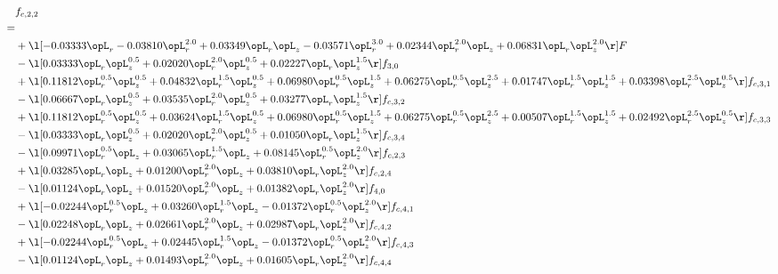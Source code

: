 \begin{alignat}{2} 
\label{eq:f_22_2} 
& f_{c,2,2} \nonumber \\ 
 = \\ 
& + \l[  -0.03333 \opL_r   -0.03810 \opL_r^{2.0} +  0.03349 \opL_r \opL_z   -0.03571 \opL_r^{3.0} +  0.02344 \opL_r^{2.0} \opL_z +  0.06831 \opL_r \opL_z^{2.0}  \r] F \nonumber \\ 
& - \l[  0.03333 \opL_r \opL_z^{0.5} +  0.02020 \opL_r^{2.0} \opL_z^{0.5} +  0.02227 \opL_r \opL_z^{1.5}  \r] f_{3,0} \nonumber \\ 
& + \l[  0.11812 \opL_r^{0.5} \opL_z^{0.5} +  0.04832 \opL_r^{1.5} \opL_z^{0.5} +  0.06980 \opL_r^{0.5} \opL_z^{1.5} +  0.06275 \opL_r^{0.5} \opL_z^{2.5} +  0.01747 \opL_r^{1.5} \opL_z^{1.5} +  0.03398 \opL_r^{2.5} \opL_z^{0.5}  \r] f_{c,3,1} \nonumber \\ 
& - \l[  0.06667 \opL_r \opL_z^{0.5} +  0.03535 \opL_r^{2.0} \opL_z^{0.5} +  0.03277 \opL_r \opL_z^{1.5}  \r] f_{c,3,2} \nonumber \\ 
& + \l[  0.11812 \opL_r^{0.5} \opL_z^{0.5} +  0.03624 \opL_r^{1.5} \opL_z^{0.5} +  0.06980 \opL_r^{0.5} \opL_z^{1.5} +  0.06275 \opL_r^{0.5} \opL_z^{2.5} +  0.00507 \opL_r^{1.5} \opL_z^{1.5} +  0.02492 \opL_r^{2.5} \opL_z^{0.5}  \r] f_{c,3,3} \nonumber \\ 
& - \l[  0.03333 \opL_r \opL_z^{0.5} +  0.02020 \opL_r^{2.0} \opL_z^{0.5} +  0.01050 \opL_r \opL_z^{1.5}  \r] f_{c,3,4} \nonumber \\ 
& - \l[  0.09971 \opL_r^{0.5} \opL_z +  0.03065 \opL_r^{1.5} \opL_z +  0.08145 \opL_r^{0.5} \opL_z^{2.0}  \r] f_{c,2,3} \nonumber \\ 
& + \l[  0.03285 \opL_r \opL_z +  0.01200 \opL_r^{2.0} \opL_z +  0.03810 \opL_r \opL_z^{2.0}  \r] f_{c,2,4} \nonumber \\ 
& - \l[  0.01124 \opL_r \opL_z +  0.01520 \opL_r^{2.0} \opL_z +  0.01382 \opL_r \opL_z^{2.0}  \r] f_{4,0} \nonumber \\ 
& + \l[  -0.02244 \opL_r^{0.5} \opL_z +  0.03260 \opL_r^{1.5} \opL_z   -0.01372 \opL_r^{0.5} \opL_z^{2.0}  \r] f_{c,4,1} \nonumber \\ 
& - \l[  0.02248 \opL_r \opL_z +  0.02661 \opL_r^{2.0} \opL_z +  0.02987 \opL_r \opL_z^{2.0}  \r] f_{c,4,2} \nonumber \\ 
& + \l[  -0.02244 \opL_r^{0.5} \opL_z +  0.02445 \opL_r^{1.5} \opL_z   -0.01372 \opL_r^{0.5} \opL_z^{2.0}  \r] f_{c,4,3} \nonumber \\ 
& - \l[  0.01124 \opL_r \opL_z +  0.01493 \opL_r^{2.0} \opL_z +  0.01605 \opL_r \opL_z^{2.0}  \r] f_{c,4,4} \nonumber \\ 
\end{alignat} 


